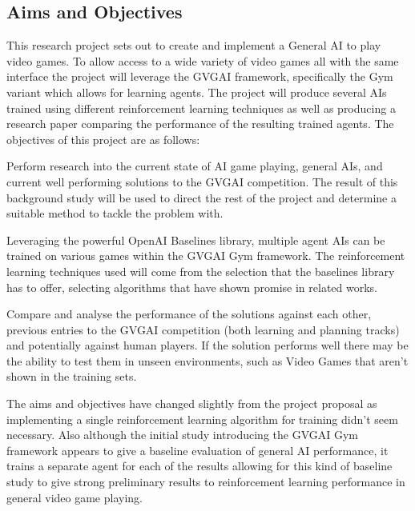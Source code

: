 \documentclass[a4paper]{article}
\begin{document}
\subsection{Aims and Objectives}
This research project sets out to create and implement a General AI to play video games.
To allow access to a wide variety of video games all with the same interface the project will leverage the GVGAI framework\cite{GVGAI2014}, specifically the Gym variant which allows for learning agents\cite{GVGAIGYM}.
The project will produce several AIs trained using different reinforcement learning techniques as well as producing a research paper comparing the performance of the resulting trained agents.
The objectives of this project are as follows:
\begin{description}
    \setlength{\parskip}{0pt}
    \item [Background Research]
    Perform research into the current state of AI game playing, general AIs, and current well performing solutions to the GVGAI competition.
    The result of this background study will be used to direct the rest of the project and determine a suitable method to tackle the problem with.

    \item [Train multiple General AIs]
    Leveraging the powerful OpenAI Baselines library\cite{baselines}, multiple agent AIs can be trained on various games within the GVGAI Gym framework.
    The reinforcement learning techniques used will come from the selection that the baselines library has to offer, selecting algorithms that have shown promise in related works.

    \item [Evaluation and Analysis of Solutions]
    Compare and analyse the performance of the solutions against each other, previous entries to the GVGAI competition (both learning and planning tracks) and potentially against human players.
    If the solution performs well there may be the ability to test them in unseen environments, such as Video Games that aren't shown in the training sets.
\end{description}
The aims and objectives have changed slightly from the project proposal as implementing a single reinforcement learning algorithm for training didn't seem necessary.
Also although the initial study introducing the GVGAI Gym framework appears to give a baseline evaluation of general AI performance, it trains a separate agent for each of the results allowing for this kind of baseline study to give strong preliminary results to reinforcement learning performance in general video game playing.
\end{document}

